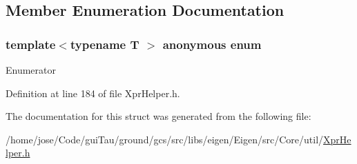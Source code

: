 \subsection{Member Enumeration Documentation}
\hypertarget{structei__must__nest__by__value_3_01_nest_by_value_3_01_t_01_4_01_4_ad37cdcb9e26468fe206c79680bbd2d29}{\subsubsection[{anonymous enum}]{\setlength{\rightskip}{0pt plus 5cm}template$<$typename T $>$ anonymous enum}}\label{structei__must__nest__by__value_3_01_nest_by_value_3_01_t_01_4_01_4_ad37cdcb9e26468fe206c79680bbd2d29}
\begin{Desc}
\item[Enumerator]\par
\begin{description}
\item[{\em 
\hypertarget{structei__must__nest__by__value_3_01_nest_by_value_3_01_t_01_4_01_4_ad37cdcb9e26468fe206c79680bbd2d29ac0024792ad760db961cded5629272fec}{ret}\label{structei__must__nest__by__value_3_01_nest_by_value_3_01_t_01_4_01_4_ad37cdcb9e26468fe206c79680bbd2d29ac0024792ad760db961cded5629272fec}
}]\end{description}
\end{Desc}


Definition at line 184 of file Xpr\-Helper.\-h.



The documentation for this struct was generated from the following file\-:\begin{DoxyCompactItemize}
\item 
/home/jose/\-Code/gui\-Tau/ground/gcs/src/libs/eigen/\-Eigen/src/\-Core/util/\hyperlink{_xpr_helper_8h}{Xpr\-Helper.\-h}\end{DoxyCompactItemize}
